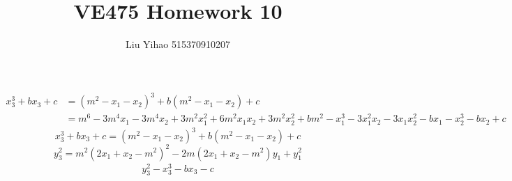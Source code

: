 \documentclass{article}
\title{VE475 Homework 10}
\author{Liu Yihao 515370910207}
\date{}
\begin{document}
\maketitle

\section{}
\begin{align*}
x_3^3+bx_3+c&=(m^2-x_1-x_2)^3+b(m^2-x_1-x_2)+c\\
&=m^6-3m^4x_1-3m^4x_2+3m^2x_1^2+6m^2x_1x_2+3m^2x_2^2+bm^2-x_1^3-3x_1^2x_2-3x_1x_2^2-bx_1-x_2^3-bx_2+c
\end{align*}
$$x_3^3+bx_3+c=(m^2-x_1-x_2)^3+b(m^2-x_1-x_2)+c$$
$$y_3^2=m^2(2x_1+x_2-m^2)^2-2m(2x_1+x_2-m^2)y_1+y_1^2$$
\begin{align*}
y_3^2-x_3^3-bx_3-c
\end{align*}
\end{document}
